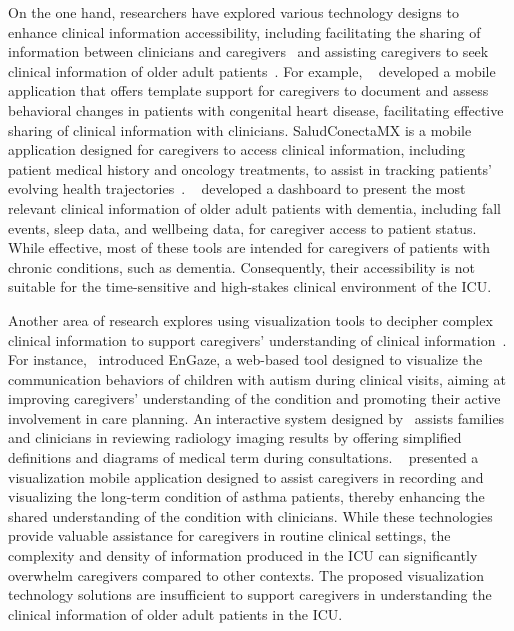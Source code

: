 On the one hand, researchers have explored various technology designs to enhance clinical information accessibility, including facilitating the sharing of information between clinicians and caregivers~\cite{ziqi2024, Yuexing2024, Bowers2024} and assisting caregivers to seek clinical information of older adult patients~\cite{montagna2023data, wei2024leveraging}.
For example, ~\citet{Bowers2024} developed a mobile application that offers template support for caregivers to document and assess behavioral changes in patients with congenital heart disease, facilitating effective sharing of clinical information with clinicians. 
SaludConectaMX is a mobile application designed for caregivers to access clinical information, including patient medical history and oncology treatments, to assist in tracking patients' evolving health trajectories~\cite{Schnur2024}.
~\citet{Barbarossa2023} developed a dashboard to present the most relevant clinical information of older adult patients with dementia, including fall events, sleep data, and wellbeing data, for caregiver access to patient status. 
While effective, most of these tools are intended for caregivers of patients with chronic conditions, such as dementia.
Consequently, their accessibility is not suitable for the time-sensitive and high-stakes clinical environment of the ICU.

Another area of research explores using visualization tools to decipher complex clinical information to support caregivers' understanding of clinical information~\cite{kong2017comparative, Hong2017, Nyapathy2019, liu2011, Shea2019, Hwang2014}.
For instance,~\citet{kong2017comparative} introduced EnGaze, a web-based tool designed to visualize the communication behaviors of children with autism during clinical visits, aiming at improving caregivers' understanding of the condition and promoting their active involvement in care planning.
An interactive system designed by~\citet{Hong2017} assists families and clinicians in reviewing radiology imaging results by offering simplified definitions and diagrams of medical term during consultations.
~\citet{Nyapathy2019} presented a visualization mobile application designed to assist caregivers in recording and visualizing the long-term condition of asthma patients, thereby enhancing the shared understanding of the condition with clinicians.
While these technologies provide valuable assistance for caregivers in routine clinical settings, the complexity and density of information produced in the ICU can significantly overwhelm caregivers compared to other contexts.
The proposed visualization technology solutions are insufficient to support caregivers in understanding the clinical information of older adult patients in the ICU. 

